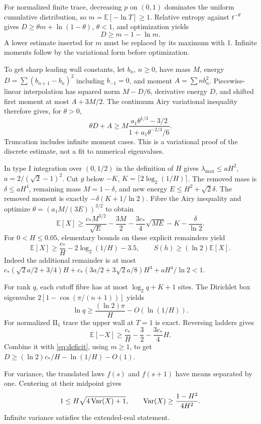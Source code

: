 For normalized finite trace, decreasing $p$ on $(0,1)$ dominates the uniform cumulative distribution, so $m=\mathbb E[-\ln T]\ge1$. Relative entropy against $t^{-\theta}$ gives $D\ge\theta m+\ln(1-\theta)$, $\theta<1$, and optimization yields
\begin{equation}\label{eq:deficit}
 D\ge m-1-\ln m.
\end{equation}
A lower estimate inserted for $m$ must be replaced by its maximum with 1. Infinite moments follow by the variational form before optimization.

To get sharp leading wall constants, let $b_n$, $n\ge0$, have mass $M$, energy $D=\sum(b_{n+1}-b_n)^2$ including $b_{-1}=0$, and moment $A=\sum nb_n^2$. Piecewise-linear interpolation has squared norm $M-D/6$, derivative energy $D$, and shifted first moment at most $A+3M/2$. The continuum Airy variational inequality therefore gives, for $\theta>0$,
\[
 \theta D+A\ge
 M\frac{a_1\theta^{1/3}-3/2}{1+a_1\theta^{-2/3}/6}.
\]
Truncation includes infinite moment cases. This is a variational proof of the discrete estimate, not a fit to numerical eigenvalues.

In type I integration over $(0,1/2)$ in the definition of $H$ gives $\lambda_{\max}\le aH^2$, $a=2/(\sqrt2-1)^2$. Cut $g$ below $-K$, $K=\lceil2\log_2(1/H)\rceil$. The removed mass is $\delta\le aH^4$, remaining mass $M=1-\delta$, and new energy $E\le H^2+\sqrt2\delta$. The removed moment is exactly $-\delta(K+1/\ln2)$. Fibre the Airy inequality and optimize $\theta=(a_1M/(3E))^{3/2}$ to obtain
\[
 \mathbb E[X]\ge\frac{c_*M^{3/2}}{\sqrt E}-\frac{3M}{2}
 -\frac{3c_*}{4}\sqrt{ME}-K-\frac\delta{\ln2}.
\]
For $0<H\le0.05$, elementary bounds on these explicit remainders yield
\begin{equation}\label{eq:wall}
 \mathbb E[X]\ge\frac{c_*}H-2\log_2(1/H)-3.5,\qquad
 S(h)\ge(\ln2)\mathbb E[X].
\end{equation}
Indeed the additional remainder is at most
$c_*(\sqrt2a/2+3/4)H+c_*(3a/2+3\sqrt2a/8)H^3+aH^4/\ln2<1$.

For rank $q$, each cutoff fibre has at most $\log_2q+K+1$ sites. The Dirichlet box eigenvalue $2[1-\cos(\pi/(n+1))]$ yields
\[
 \ln q\ge\frac{(\ln2)\pi}H-O(\ln(1/H)).
\]
For normalized $\mathrm{II}_1$ trace the upper wall at $T=1$ is exact. Reversing ladders gives
\[
 \mathbb E[-X]\ge\frac{c_*}H-\frac32-\frac{3c_*}{4}H.
\]
Combine it with \eqref{eq:deficit}, using $m\ge1$, to get $D\ge(\ln2)c_*/H-\ln(1/H)-O(1)$.

For variance, the translated laws $f(s)$ and $f(s+1)$ have means separated by one. Centering at their midpoint gives
\[
 1\le H\sqrt{4\operatorname{Var}(X)+1},\qquad
 \operatorname{Var}(X)\ge\frac{1-H^2}{4H^2}.
\]
Infinite variance satisfies the extended-real statement.

